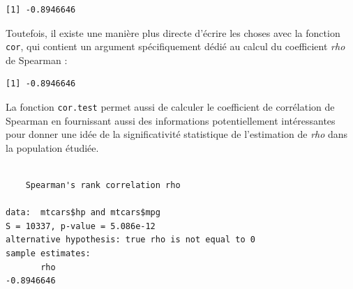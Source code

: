 \documentclass[
  letterpaper,
]{book}
\newenvironment{Shaded}{\begin{snugshade}}{\end{snugshade}}
\newcommand{\AttributeTok}[1]{\textcolor[rgb]{0.40,0.45,0.13}{#1}}
\newcommand{\FunctionTok}[1]{\textcolor[rgb]{0.28,0.35,0.67}{#1}}
\newcommand{\NormalTok}[1]{\textcolor[rgb]{0.00,0.23,0.31}{#1}}
\newcommand{\SpecialCharTok}[1]{\textcolor[rgb]{0.37,0.37,0.37}{#1}}
\newcommand{\StringTok}[1]{\textcolor[rgb]{0.13,0.47,0.30}{#1}}
\begin{document}
\begin{Shaded}
\end{Shaded}

\begin{verbatim}
[1] -0.8946646
\end{verbatim}

Toutefois, il existe une manière plus directe d'écrire les choses avec
la fonction \texttt{cor}, qui contient un argument spécifiquement dédié
au calcul du coefficient \emph{rho} de Spearman :

\begin{Shaded}
\end{Shaded}

\begin{verbatim}
[1] -0.8946646
\end{verbatim}

La fonction \texttt{cor.test} permet aussi de calculer le coefficient de
corrélation de Spearman en fournissant aussi des informations
potentiellement intéressantes pour donner une idée de la significativité
statistique de l'estimation de \emph{rho} dans la population étudiée.

\begin{Shaded}
\end{Shaded}

\begin{verbatim}

    Spearman's rank correlation rho

data:  mtcars$hp and mtcars$mpg
S = 10337, p-value = 5.086e-12
alternative hypothesis: true rho is not equal to 0
sample estimates:
       rho 
-0.8946646 
\end{verbatim}
\end{document}
